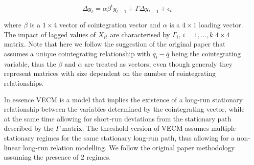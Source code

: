 \documentclass{article}
\begin{document}
\begin{equation}
\Delta y_t = \alpha\beta^ty_{t-1} + \Gamma\Delta y_{t-1} + \epsilon_t 
\end{equation}

where $\beta$ is a $1 \times 4$ vector of cointegration vector and $\alpha$ is a $4 \times 1$ loading vector. The impact of lagged values of $X_{it}$ are characterised by $\Gamma_i$, $i = 1,...,k$ $4 \times 4$ matrix. Note that here we follow the suggestion of the original paper that assumes a unique cointegrating relationship with $q_t - \bar{q}$ being the cointegrating variable, thus the $\beta$ and $\alpha$ are treated as vectors, even though generaly they represent matrices with size dependent on the number of cointegrating relationships. 

In essence VECM is a model that implies the existence of a long-run stationary relationship between the variables determined by the cointegrating vector, while at the same time allowing for short-run deviations from the stationary path described by the $\Gamma$ matrix. The threshold version of VECM assumes multiple stationary regimes for the same stationary long-run path, thus allowing for a non-linear long-run relation modelling. We follow the original paper methodology assuming the presence of 2 regimes. 
\end{document}
